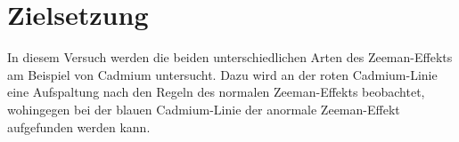 \section{Zielsetzung}
\label{sec:Zielsetzung}

\raggedright

        In diesem Versuch werden die beiden unterschiedlichen Arten des Zeeman-Effekts 
        am Beispiel von Cadmium untersucht. Dazu wird an der roten Cadmium-Linie eine 
        Aufspaltung nach den Regeln des normalen Zeeman-Effekts beobachtet, wohingegen 
        bei der blauen Cadmium-Linie der anormale Zeeman-Effekt aufgefunden werden kann.